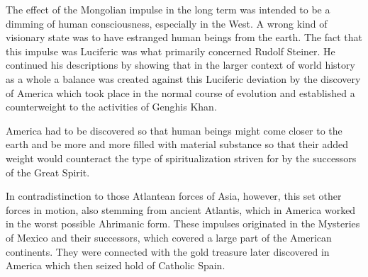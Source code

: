 The effect of the Mongolian impulse in the long term was intended to be a dimming of human consciousness, especially in the West. A wrong kind of visionary state was to have estranged human beings from the earth. The fact that this impulse was Luciferic was what primarily concerned Rudolf Steiner. He continued his descriptions by showing that in the larger context of world history as a whole a balance was created against this Luciferic deviation by the discovery of America which took place in the normal course of evolution and established a counterweight to the activities of Genghis Khan.

America had to be discovered so that human beings might come closer to the earth and be more and more filled with material substance so that their added weight would counteract the type of spiritualization striven for by the successors of the Great Spirit.

In contradistinction to those Atlantean forces of Asia, however, this set other forces in motion, also stemming from ancient Atlantis, which in America worked in the worst possible Ahrimanic form. These impulses originated in the Mysteries of Mexico and their successors, which covered a large part of the American continents. They were connected with the gold treasure later discovered in America which then seized hold of Catholic Spain.



